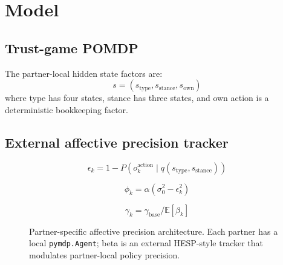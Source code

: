 \documentclass[11pt]{article}
\begin{document}
\section{Model}

\subsection{Trust-game POMDP}


The partner-local hidden state factors are:
\[
s = (s_{\mathrm{type}}, s_{\mathrm{stance}}, s_{\mathrm{own}})
\]
where type has four states, stance has three states, and own action is a
deterministic bookkeeping factor.

\subsection{External affective precision tracker}


\begin{equation}
\epsilon_k = 1 - P(o^{\mathrm{action}}_k \mid q(s_{\mathrm{type}}, s_{\mathrm{stance}}))
\end{equation}

\begin{equation}
\phi_k = \alpha(\sigma_0^2 - \epsilon_k^2)
\end{equation}

\begin{equation}
\gamma_k = \gamma_{\mathrm{base}} / \mathbb{E}[\beta_k]
\end{equation}

\begin{figure}[t]
  \centering
  \caption{Partner-specific affective precision architecture. Each partner has a local \texttt{pymdp.Agent}; beta is an external HESP-style tracker that modulates partner-local policy precision.}
  \label{fig:model-schematic}
\end{figure}
\end{document}
